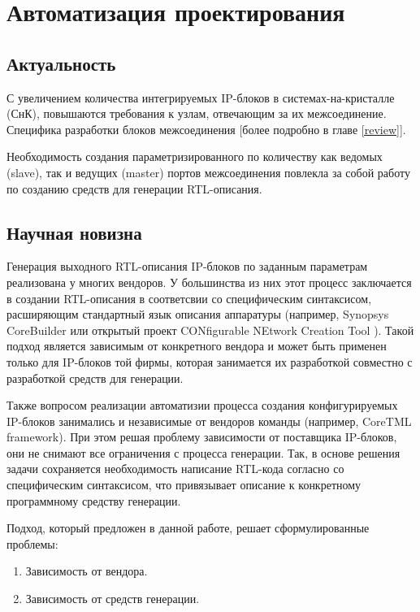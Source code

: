 
\chapter{Автоматизация проектирования}

\section{Актуальность}

С увеличением количества интегрируемых IP-блоков в системах-на-кристалле (СнК), повышаются требования к узлам, отвечающим за их межсоединение.
Специфика разработки блоков межсоединения [{\color{red}более подробно в главе \ref{review}}].

Необходимость создания параметризированного по количеству как ведомых (slave), так и ведущих (master) портов межсоединения повлекла за собой работу по созданию средств для генерации RTL-описания.

\section{Научная новизна}

Генерация выходного RTL-описания IP-блоков по заданным параметрам реализована у многих вендоров. У большинства из них этот процесс заключается в создании RTL-описания в соответсвии со специфическим синтаксисом, расширяющим стандартный язык описания аппаратуры (например, Synopsys CoreBuilder или открытый проект CONfigurable NEtwork Creation Tool \cite{website:Connect}). Такой подход является зависимым от конкретного вендора и может быть применен только для IP-блоков той фирмы, которая занимается их разработкой совместно с разработкой средств для генерации.

Также вопросом реализации автоматизии процесса создания конфигурируемых IP-блоков занимались и независимые от вендоров команды (например, CoreTML framework). При этом решая проблему зависимости от поставщика IP-блоков, они не снимают все ограничения с процесса генерации. Так, в основе решения задачи сохраняется необходимость написание RTL-кода согласно со специфическим синтаксисом, что привязывает описание к конкретному программному средству генерации.

Подход, который предложен в данной работе, решает сформулированные проблемы:
\begin{enumerate}
  \item Зависимость от вендора.
  \item Зависимость от средств генерации.
\end{enumerate}

